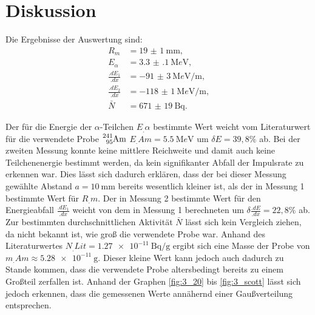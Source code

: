 
\section{Diskussion}
\label{sec:Diskussion}

Die Ergebnisse der Auswertung sind:
\begin{align*}
R_m			&= \SI{19(1)}{\milli\metre}\text{,}\\
E_\alpha 	&= \SI{3.3(1)}{\mega e\volt}\text{,}\\
\frac{.dE_1}{.dx}	&= \SI{-91(3)}{\mega e\volt\per\metre}\text{,}\\
\frac{.dE_2}{.dx}	&= \SI{-118(1)}{\mega e\volt\per\metre}\text{,}\\
\bar{N}		&= \SI{671(19)}{\becquerel} \text{.}
\end{align*}

Der für die Energie der $\alpha$-Teilchen $E_.{\alpha}$ bestimmte Wert weicht vom Literaturwert für die verwendete Probe $\ce{^{241}_{95}Am}$
$E_.{Am} = \SI{5,5}{\mega e\volt}$\cite{Americium-241} um $\delta E = 39,8\%$ ab.
Bei der zweiten Messung konnte keine mittlere Reichweite und damit auch keine Teilchenenergie bestimmt werden, da kein signifikanter Abfall der Impulsrate zu erkennen war. Dies lässt sich dadurch erklären, dass der bei dieser Messung gewählte Abstand $a=\SI{10}{\milli\metre}$ bereits wesentlich kleiner ist, als der in Messung 1 bestimmte Wert für $R_.m$.
Der in Messung 2 bestimmte Wert für den Energieabfall $\frac{.dE_1}{.dx}$ weicht von dem in Messung 1 berechneten um $\delta \frac{.dE}{.dx}= 22,8\%$ ab.
Zur bestimmten durchschnittlichen Aktivität $\bar{N}$ lässt sich kein Vergleich ziehen, da nicht bekannt ist, wie groß die verwendete Probe war.
Anhand des Literaturwertes $N_.{Lit}=\SI{1,27e-11}{\becquerel\per\gram}$\cite{Americium-241} ergibt sich eine Masse der Probe von $m_.{Am}\approx \SI{5,28e-11}{\gram}$. Dieser kleine Wert kann jedoch auch dadurch zu Stande kommen, dass die verwendete Probe altersbedingt bereits zu einem Großteil zerfallen ist.
Anhand der Graphen \ref{fig:3_20} bis \ref{fig:3_scott} lässt sich jedoch erkennen, dass die gemessenen Werte annähernd einer Gaußverteilung entsprechen.